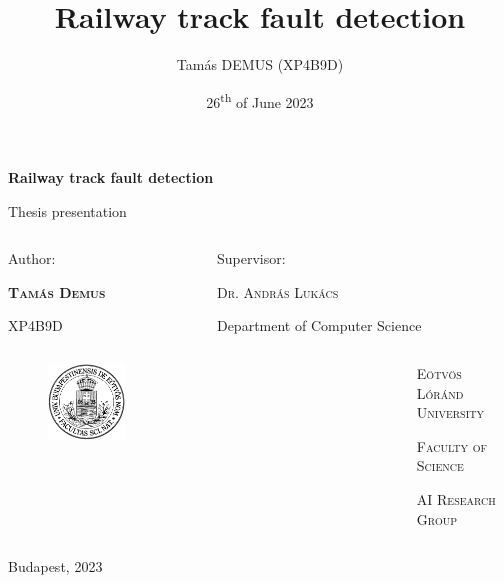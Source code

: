 \documentclass[aspectratio=169]{beamer}
\title{Railway track fault detection}
\author{Tamás DEMUS (XP4B9D)}
\date{26\textsuperscript{th} of June 2023}
\begin{document}
\begin{frame}
    \thispagestyle{empty}
    \begin{center}

        {\Large\textbf{Railway track fault detection}}

        \vspace*{0.5cm}

        Thesis presentation

        \vspace*{0.5cm}

        \begin{columns}[c]
            \begin{column}{0.45\textwidth}
                \centering
                {\small
                    Author:

                    \textbf{\textsc{Tamás Demus}}

                    XP4B9D
                }
            \end{column}
            \begin{column}{0.45\textwidth}
                \centering
                {\small
                    Supervisor:

                    \textsc{Dr. András Lukács}

                    Department of Computer Science
                }
            \end{column}
        \end{columns}

        \vspace*{\fill}

        \begin{columns}[c]
            \begin{column}{0.45\textwidth}
                \begin{figure}[H]
                    \raggedleft
                    \includegraphics[width=0.25\textwidth]{./tex_images/elte_logo.png}
                \end{figure}
            \end{column}
            \begin{column}{0.45\textwidth}
                {\footnotesize\textsc{Eötvös Lóránd University}}

                {\footnotesize\textsc{Faculty of Science}}

                {\footnotesize\textsc{AI Research Group}}
            \end{column}
        \end{columns}

        \vspace*{0.5cm}

        {\small Budapest, 2023}
    \end{center}
\end{frame}
\end{document}

